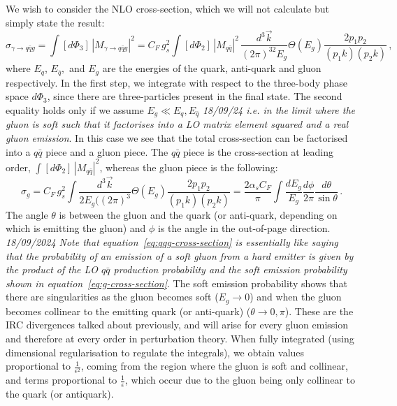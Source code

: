 We wish to consider the NLO cross-section, which we will not calculate but simply state the result:
 \begin{equation}
	\sigma_{\gamma\rightarrow q\bar{q}g}=\int[d\Phi_{3}]\,|M_{\gamma\rightarrow q\bar{q}g}|^2=C_F\,g_s^2\int[d\Phi_{2}]\,|M_{q\bar{q}}|^2\,\frac{d^3\vec{k}}{(2\pi)^32E_g}\Theta(E_g)\frac{2p_1p_2}{(p_1k)(p_2k)}\,,
	\label{eq:qqg-cross-section}
\end{equation}
where $E_q$, $E_{\bar{q}},$ and $E_g$ are the energies of the quark, anti-quark and gluon respectively. In the first step, we integrate with respect to the three-body phase space $d\Phi_{3}$, since there are three-particles present in the final state. The second equality holds only if we assume $E_g\ll E_q,E_{\bar{q}}$ \emph{18/09/24 i.e. in the limit where the gluon is soft such that it factorises into a LO matrix element squared and a real gluon emission}. In this case we see that the total cross-section can be factorised into a $q\bar{q}$ piece and a gluon piece. The $q\bar{q}$ piece is the cross-section at leading order, $\int[d\Phi_{2}]\,|M_{q\bar{q}}|^2$, whereas the gluon piece is the following:%
\begin{equation}
	\sigma_g=C_F\,g_s^2\int\frac{d^3\vec{k}}{2E_g((2\pi)^3}\Theta(E_g)\frac{2p_1p_2}{(p_1k)(p_2k)}=\frac{2\alpha_sC_F}{\pi}\int\frac{dE_g}{E_g}\frac{d\phi}{2\pi}\frac{d\theta}{\sin\theta}\,.
	\label{eq:g-cross-section}
\end{equation}
The angle $\theta$ is between the gluon and the quark (or anti-quark, depending on which is emitting the gluon) and $\phi$ is the angle in the out-of-page direction. \emph{18/09/2024 Note that equation~\eqref{eq:qqg-cross-section} is essentially like saying that the probability of an emission of a soft gluon from a hard emitter is given by the product of the LO $q\bar{q}$ production probability and the soft emission probability shown in equation~\eqref{eq:g-cross-section}}. The soft emission probability shows that there are singularities as the gluon becomes soft ($E_g\rightarrow0$) and when the gluon becomes collinear to the emitting quark (or anti-quark) ($\theta\rightarrow0,\pi$).
These are the IRC divergences talked about previously, and will arise for every gluon emission and therefore at every order in perturbation theory. When fully integrated (using dimensional regularisation to regulate the integrals), we obtain values proportional to $\frac{1}{\epsilon^2}$,  coming from the region where the gluon is soft and collinear, and terms proportional to $\frac{1}{\epsilon}$, which occur due to the gluon being only collinear to the quark (or antiquark). 
